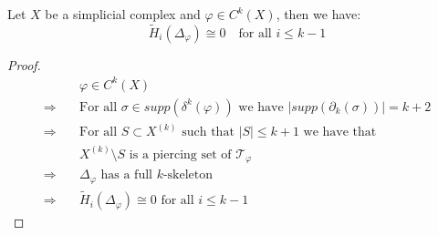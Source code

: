 
\begin{thm}
Let \(X\) be a simplicial complex and \(\varphi\in C^k(X)\), then we have:
\[
\tilde{H}_i(\Delta_{\varphi})\cong 0\quad\text{for all }i\leq k-1
\]
\begin{proof}
\begin{align*}
& \varphi\in C^k(X) \\
\Longrightarrow \quad & \text{For all }\sigma\in supp(\delta^k(\varphi))\text{ we have }\left|supp(\partial_k(\sigma))\right|=k+2 \\
\Longrightarrow \quad & \text{For all }S\subset X^{(k)}\text{ such that }\left|S\right|\leq k+1\text{ we have that } \\ & X^{(k)}\setminus S\text{ is a piercing set of }\mathcal{T}_{\varphi} \\
\Longrightarrow \quad & \Delta_{\varphi}\text{ has a full }k\text{-skeleton} \\
\Longrightarrow \quad & \tilde{H}_i(\Delta_{\varphi})\cong 0\text{ for all }i\leq k-1
\end{align*}
\end{proof}
\end{thm}

